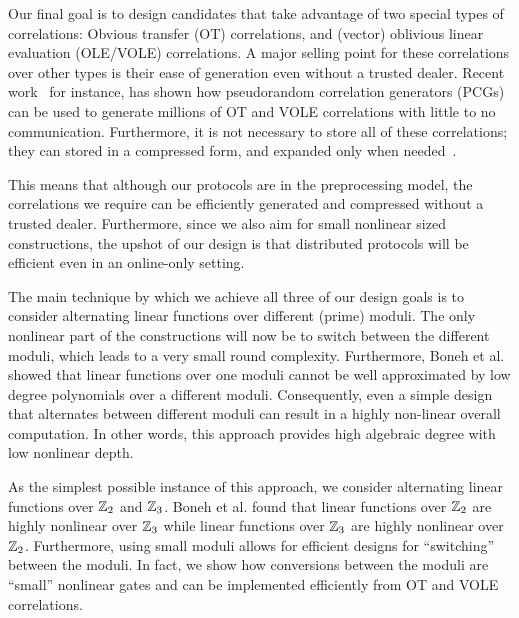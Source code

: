 \begin{itemize}[itemsep=1ex]
    \hspace*{1em} Our final goal is to design candidates that take advantage of two special types of correlations: Obvious transfer (OT) correlations, and (vector) oblivious linear evaluation (OLE/VOLE) correlations. A major selling point for these correlations over other types is their ease of generation even without a trusted dealer. Recent work~\cite{?} for instance, has shown how pseudorandom correlation generators (PCGs) can be used to generate millions of OT and VOLE correlations with little to no communication. Furthermore, it is not necessary to store all of these correlations; they can stored in a compressed form, and expanded only when needed~\cite{?}.

    \hspace*{1em} This means that although our protocols are in the preprocessing model, the correlations we require can be efficiently generated and compressed without a trusted dealer. Furthermore, since we also aim for small nonlinear sized constructions, the upshot of our design is that distributed protocols will be efficient even in an online-only setting. 
\end{itemize}

The main technique by which we achieve all three of our design goals is to consider alternating linear functions over different (prime) moduli. The only nonlinear part of the constructions will now be to switch between the different moduli, which leads to a very small round complexity. Furthermore, Boneh et al.~\cite{boneh2018-darkmatter} showed that linear functions over one moduli cannot be well approximated by low degree polynomials over a different moduli. Consequently, even a simple design that alternates between different moduli can result in a highly non-linear overall computation. In other words, this approach provides high algebraic degree with low nonlinear depth. 

As the simplest possible instance of this approach, we consider alternating linear functions over $\mathbb{Z}_2$ and $\mathbb{Z}_3$. Boneh et al. found that linear functions over $\mathbb{Z}_2$ are highly nonlinear over $\mathbb{Z}_3$ while linear functions over $\mathbb{Z}_3$ are highly nonlinear over $\mathbb{Z}_2$. Furthermore, using small moduli allows for efficient designs for ``switching'' between the moduli. In fact, we show how conversions between the moduli are “small” nonlinear gates and can be implemented efficiently from OT and VOLE correlations.



